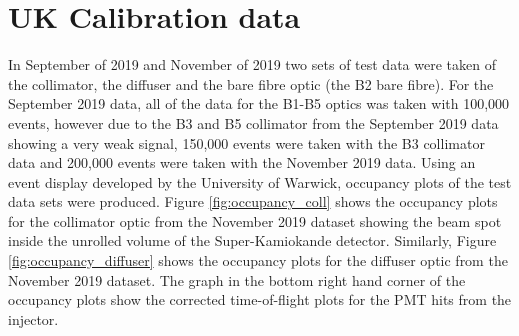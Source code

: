 \section{UK Calibration data}

In September of 2019 and November of 2019 two sets of test data were taken of the collimator, the diffuser and the bare fibre optic (the B2 bare fibre). For the September 2019 data, all of the data for the B1-B5 optics was taken with 100,000 events, however due to the B3 and B5 collimator from the September 2019 data showing a very weak signal, 150,000 events were taken with the B3 collimator data and 200,000 events were taken with the November 2019 data. Using an event display developed by the University of Warwick, occupancy plots of the test data sets were produced. Figure \ref{fig:occupancy_coll} shows the occupancy plots for the collimator optic from the November 2019 dataset showing the beam spot inside the unrolled volume of the Super-Kamiokande detector. Similarly, Figure \ref{fig:occupancy_diffuser} shows the occupancy plots for the diffuser optic from the November 2019 dataset. The graph in the bottom right hand corner of the occupancy plots show the corrected time-of-flight plots for the PMT hits from the injector. 

